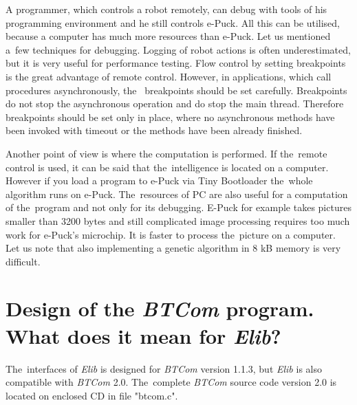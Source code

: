   A programmer, which controls a robot remotely, can debug with tools of his programming environment and he still controls e-Puck.
  All this can be utilised, because a computer has much more resources than e-Puck.
  Let us mentioned a~few  techniques for debugging. Logging of robot actions is often underestimated,
  but it is very useful for performance testing. Flow control by setting breakpoints is the great advantage
  of remote control. However, in applications, which call procedures asynchronously, the~ breakpoints should be set carefully.
  Breakpoints do not stop the asynchronous operation and do stop the main thread.
  Therefore breakpoints should be set only in place, where no asynchronous methods have been invoked with timeout
  or the methods have been already finished.
  
  Another point of view is where the computation is performed.
  If the~remote control is used, it can be said that the~intelligence 
  is located on a computer. However if you load a program to e-Puck via Tiny Bootloader the~whole algorithm
  runs on e-Puck.
  The~resources of PC are also useful for a computation of the~program and not only for
  its debugging. E-Puck for example takes pictures smaller than 3200 bytes and still complicated image processing 
  requires too much work for e-Puck's microchip. It is faster to process the~picture
  on a computer. 
  Let us note that also implementing a genetic algorithm in 8 kB memory
  is very difficult.

\section{Design of the {\it BTCom} program. What does it mean for {\it Elib}?}
  \label{sec:btcomdesign}
  The~interfaces of {\it Elib} is designed for {\it BTCom} version 1.1.3, but {\it Elib} is also compatible with {\it BTCom} 2.0.
  The~complete {\it BTCom} source code version 2.0 is located on enclosed CD in file "btcom.c".

